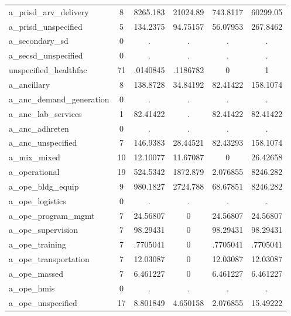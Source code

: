 \begin{table}[htbp]
\begin{tabular}{l*{1}{ccccc}}
a\_prisd\_arv\_delivery&           8&    8265.183&    21024.89&    743.8117&    60299.05\\
a\_prisd\_unspecified&           5&    134.2375&    94.75157&    56.07953&    267.8462\\
a\_secondary\_sd&           0&           .&           .&           .&           .\\
a\_secsd\_unspecified&           0&           .&           .&           .&           .\\
unspecified\_healthfac&          71&    .0140845&    .1186782&           0&           1\\
a\_ancillary &           8&    138.8728&    34.84192&    82.41422&    158.1074\\
a\_anc\_demand\_generation&           0&           .&           .&           .&           .\\
a\_anc\_lab\_services&           1&    82.41422&           .&    82.41422&    82.41422\\
a\_anc\_adhreten&           0&           .&           .&           .&           .\\
a\_anc\_unspecified&           7&    146.9383&    28.44521&    82.43293&    158.1074\\
a\_mix\_mixed &          10&    12.10077&    11.67087&           0&    26.42658\\
a\_operational&          19&    524.5342&    1872.879&    2.076855&    8246.282\\
a\_ope\_bldg\_equip&           9&    980.1827&    2724.788&    68.67851&    8246.282\\
a\_ope\_logistics&           0&           .&           .&           .&           .\\
a\_ope\_program\_mgmt&           7&    24.56807&           0&    24.56807&    24.56807\\
a\_ope\_supervision&           7&    98.29431&           0&    98.29431&    98.29431\\
a\_ope\_training&           7&    .7705041&           0&    .7705041&    .7705041\\
a\_ope\_transportation&           7&    12.03087&           0&    12.03087&    12.03087\\
a\_ope\_massed&           7&    6.461227&           0&    6.461227&    6.461227\\
a\_ope\_hmis  &           0&           .&           .&           .&           .\\
a\_ope\_unspecified&          17&    8.801849&    4.650158&    2.076855&    15.49222\\

\end{tabular}
\end{table}
